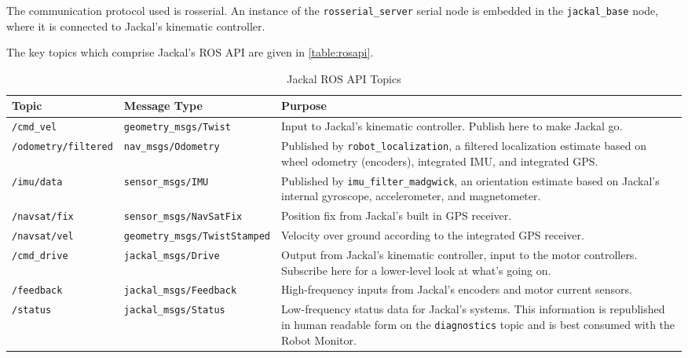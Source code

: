 \documentclass[]{clearpath-latex/clearpath-manual}
\begin{document}
The communication protocol used is rosserial. An instance of the \lstinline{rosserial_server}
serial node is embedded in the \lstinline{jackal_base} node, where it is connected to
Jackal's kinematic controller.

The key topics which comprise Jackal's ROS API are given in \autoref{table:rosapi}.

\bgroup
\begin{table}[htp]
\begin{tabular}{  l  l  p{7cm} }
\hline
Topic & Message Type & Purpose \\ \hline

\lstinline!/cmd_vel! & \lstinline!geometry_msgs/Twist! &
Input to Jackal's kinematic controller. Publish here to make Jackal go. \\ \hline
\lstinline!/odometry/filtered! & \lstinline!nav_msgs/Odometry! &
Published by \lstinline!robot_localization!, a filtered localization estimate based
on wheel odometry (encoders), integrated IMU, and integrated GPS. \\ \hline

\lstinline!/imu/data! & \lstinline!sensor_msgs/IMU! &
Published by \lstinline!imu_filter_madgwick!, an orientation estimate based on Jackal's
internal gyroscope, accelerometer, and magnetometer. \\ \hline
\lstinline!/navsat/fix! & \lstinline!sensor_msgs/NavSatFix! &
Position fix from Jackal's built in GPS receiver. \\ \hline
\lstinline!/navsat/vel! & \lstinline!geometry_msgs/TwistStamped! &
Velocity over ground according to the integrated GPS receiver.\\ \hline

\lstinline!/cmd_drive! & \lstinline!jackal_msgs/Drive! &
Output from Jackal's kinematic controller, input to the motor controllers. Subscribe here for a lower-level look at what's going on. \\ \hline
\lstinline!/feedback! & \lstinline!jackal_msgs/Feedback! &
High-frequency inputs from Jackal's encoders and motor current sensors. \\ \hline
\lstinline!/status! & \lstinline!jackal_msgs/Status! &
Low-frequency status data for Jackal's systems. This information is republished in human
readable form on the \lstinline!diagnostics! topic and is best consumed with the Robot
Monitor. \\ \hline
\end{tabular}
\caption{Jackal ROS API Topics}
\label{table:rosapi}
\end{table}
\egroup
\end{document}
